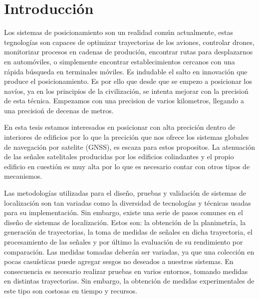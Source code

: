\chapter*{Introducción}


Los sistemas de posicionamiento son un realidad común actualmente, estas tegnologías son capaces de optimizar trayectorias de los aviones, controlar drones, monitorizar procesos en cadenas de produción, encontrar rutas para desplazarnos en automóviles, o simplemente encontrar establecimientos cercanos con una rápida búsqueda en  terminales móviles. Es indudable el salto en innovación que produce el posicionamiento. Es por ello que desde que se empezo a posicionar los navíos, ya en los principios de la civilización, se intenta mejorar con la precisioń de esta técnica. Empezamos con una precision de varios kilometros, llegando a una precisioń de decenas de metros. \cite{Jang2019}


En esta tesis estamos interesados en posicionar con alta precición dentro de interiores de edificios por lo que la precición que nos ofrece los sistemas globales de navegación por satelite (GNSS), es escaza para estos propositos. La atenuación de las señales satelitales producidas por los edificios colindantes y el propio edificio en cuestión es muy alta por lo que es necesario contar con otros tipos de mecanismos. 


Las metodologías utilizadas para el diseño, pruebas y validación de sistemas de localización son tan variadas como la diversidad de tecnologías y técnicas usadas para su implementación. Sin embargo, existe una serie de pasos comunes en el diseño de sistemas de localización. Estos son: la obtención de la planimetría, la generación de trayectorias, la toma de medidas de señales en dicha trayectoria, el procesamiento de las señales y por último la evaluación de su rendimiento por comparación. Las medidas tomadas deberán ser variadas, ya que una colección en pocas casuísticas puede agregar sesgos no deseados a nuestros sistemas. En consecuencia es necesario realizar pruebas en varios entornos, tomando medidas en distintas trayectorias. Sin embargo, la obtención de medidas experimentales de este tipo son costosas en tiempo y recursos.

